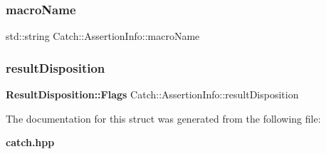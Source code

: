\mbox{\label{struct_catch_1_1_assertion_info_ac2e59e8c89e00eb3390768f50d540b18}} 
\subsubsection{macro\+Name}
{\footnotesize\ttfamily std\+::string Catch\+::\+Assertion\+Info\+::macro\+Name}

\mbox{\label{struct_catch_1_1_assertion_info_a60353b3632ab2f827162f2b2d6911073}} 
\subsubsection{result\+Disposition}
{\footnotesize\ttfamily \textbf{ Result\+Disposition\+::\+Flags} Catch\+::\+Assertion\+Info\+::result\+Disposition}



The documentation for this struct was generated from the following file\+:\begin{DoxyCompactItemize}
\item 
\textbf{ catch.\+hpp}\end{DoxyCompactItemize}
